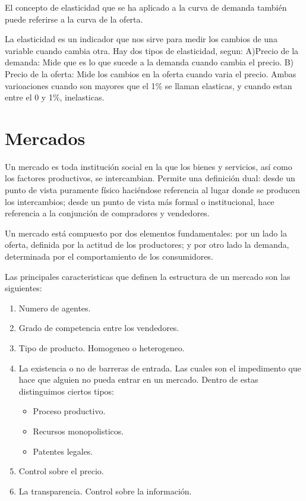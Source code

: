 \documentclass[
]{krantz}
\providecommand{\tightlist}{%
  \setlength{\itemsep}{0pt}\setlength{\parskip}{0pt}}
\begin{document}
El concepto de elasticidad que se ha aplicado a la curva de demanda también puede referirse a la curva de la oferta.

La elasticidad es un indicador que nos sirve para medir los cambios de una variable cuando cambia otra. Hay dos tipos de elasticidad, segun: A)Precio de la demanda: Mide que es lo que sucede a la demanda cuando cambia el precio. B) Precio de la oferta: Mide los cambios en la oferta cuando varia el precio. Ambas varioaciones cuando son mayores que el 1\% se llaman elasticas, y cuando estan entre el 0 y 1\%, inelasticas.

\hypertarget{mercados}{%
\chapter{Mercados}\label{mercados}}

Un mercado es toda institución social en la que los bienes y servicios, así como los factores productivos, se intercambian. Permite una definición dual: desde un punto de vista puramente físico haciéndose referencia al lugar donde se producen los intercambios; desde un punto de vista más formal o institucional, hace referencia a la conjunción de compradores y vendedores.

Un mercado está compuesto por dos elementos fundamentales: por un lado la oferta, definida por la actitud de los productores; y por otro lado la demanda, determinada por el comportamiento de los consumidores.

Las principales caracteristicas que definen la estructura de un mercado son las siguientes:

\begin{enumerate}
\def\labelenumi{\arabic{enumi}.}
\tightlist
\item
  Numero de agentes.
\item
  Grado de competencia entre los vendedores.
\item
  Tipo de producto. Homogeneo o heterogeneo.
\item
  La existencia o no de barreras de entrada. Las cuales son el impedimento que hace que alguien no pueda entrar en un mercado. Dentro de estas distinguimos ciertos tipos:

  \begin{itemize}
  \tightlist
  \item
    Proceso productivo.
  \item
    Recursos monopolisticos.
  \item
    Patentes legales.
  \end{itemize}
\item
  Control sobre el precio.
\item
  La transparencia. Control sobre la información.
\end{enumerate}
\end{document}

